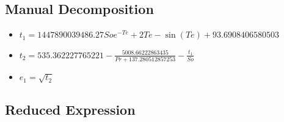 \documentclass{article}
\begin{document}
\subsection*{Manual Decomposition}
\begin{itemize}
\item $t_{1} = 1447890039486.27 So e^{- Te} + 2 Te - \sin{\left(Te \right)} + 93.6908406580503$
\item $t_{2} = 535.362227765221 - \frac{5008.66222863435}{Pr + 137.280512857253} - \frac{t_{1}}{So}$
\item $e_{1} = \sqrt{t_{2}}$
\end{itemize}
\subsection*{Reduced Expression}
\end{document}
